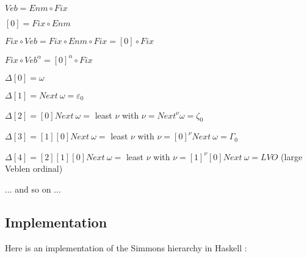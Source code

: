 \documentclass[10pt]{article}
\begin{document}
\( Veb = Enm \circ Fix \)

\( [0] = Fix \circ Enm \)

\( Fix \circ Veb = Fix \circ Enm \circ Fix = [0] \circ Fix \)

\( Fix \circ Veb^\alpha = [0]^\alpha \circ Fix \)

\( \Delta[0] = \omega \)

\( \Delta[1] = Next\ \omega = \varepsilon_0 \)

\( \Delta[2] = [0] Next\ \omega = \) least \( \nu \) with \( \nu = Next^\nu \omega = \zeta_0 \)

\( \Delta[3] = [1] [0] Next\ \omega = \) least \( \nu \) with \( \nu = [0]^\nu Next\ \omega = \Gamma_0 \)

\( \Delta[4] = [2] [1] [0] Next\ \omega = \) least \( \nu \) with \( \nu = [1]^\nu [0] Next\ \omega = LVO \) (large Veblen ordinal)

... and so on ...


\subsection{Implementation}

Here is an implementation of the Simmons hierarchy in Haskell :
\end{document}
